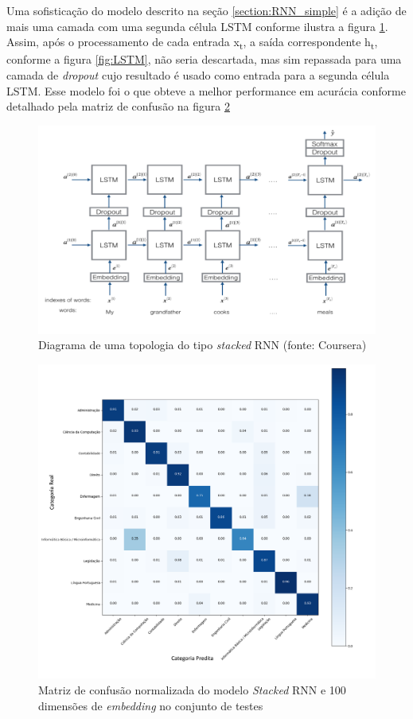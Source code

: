 Uma sofisticação do modelo descrito na seção \ref{section:RNN_simple} é a adição de mais uma camada com uma segunda célula LSTM conforme ilustra a figura \ref{fig:StackedRNN}. Assim, após o processamento de cada entrada
x\textsubscript{t}, a saída correspondente h\textsubscript{t}, conforme a figura \ref{fig:LSTM}, não seria descartada, mas sim repassada para uma camada de \textit{dropout} cujo resultado é usado como entrada para a segunda célula LSTM. Esse modelo foi o que obteve a melhor performance em acurácia conforme detalhado pela matriz de confusão na figura \ref{fig:StackedRNN_CONF}

\begin{figure}[!ht]
	\centering
	\includegraphics[width=1.0\textwidth]{figures/StackedRNN.png}
	\caption{Diagrama de uma topologia do tipo \textit{stacked} RNN (fonte: Coursera)}
	\label{fig:StackedRNN}
\end{figure}

\begin{figure}[!ht]
	\centering
	\includegraphics[width=1.0\textwidth]{figures/StackedRNN_20180918165422_100dimensions_default_-_Confusion_matrix_normalized_-_test.png}
	\caption{Matriz de confusão normalizada do modelo \textit{Stacked} RNN e 100 dimensões de \textit{embedding} no conjunto de testes}
	\label{fig:StackedRNN_CONF}
\end{figure}